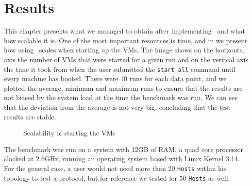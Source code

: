 \chapter{Results}
\label{chapter:Chapter 5}

This chapter presents what we managed to obtain after implementing \project\ and what how scalable it is.
One of the most important resources is time, and in  we present how using \project\ scales when starting up the VMs.
The image shows on the horizontal axis the number of VMs that were started for a given run and on the vertical axis the time it took from when the user submitted the \texttt{start_all} command until every machine has booted.
There were 10 runs for each data point, and we plotted the average, minimum and maximum runs to ensure that the results are not biased by the system load at the time the benchmark was run.
We can see that the deviation from the average is not very big, concluding that the test results are stable.

\begin{figure}[htb]
	\begin{center}
	\caption{Scalability of starting the VMs \label{img:time-for-starting-vms}}
	\end{center}
\end{figure}

The benchmark was run on a system with 12GB of RAM, a quad core processor clocked at 2.6GHz, running an operating system based with Linux Kernel 3.14.
For the general case, a user would not need more than 20 \texttt{Hosts} within his topology to test a protocol, but for reference we tested for 50 \texttt{Hosts} as well.

